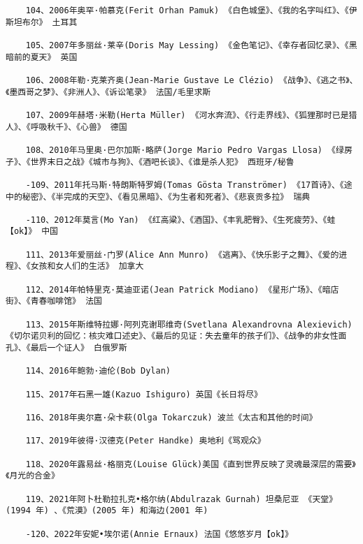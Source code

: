 \documentclass[UTF8]{../RepresentationUniverse}
\begin{document}
\begin{lstlisting}
    104、2006年奥罕·帕慕克(Ferit Orhan Pamuk) 《白色城堡》、《我的名字叫红》、《伊斯坦布尔》 土耳其
    
    105、2007年多丽丝·莱辛(Doris May Lessing) 《金色笔记》、《幸存者回忆录》、《黑暗前的夏天》 英国
    
    106、2008年勒·克莱齐奥(Jean-Marie Gustave Le Clézio) 《战争》、《逃之书》、《墨西哥之梦》、《非洲人》、《诉讼笔录》 法国/毛里求斯
    
    107、2009年赫塔·米勒(Herta Müller) 《河水奔流》、《行走界线》、《狐狸那时已是猎人》、《呼吸秋千》、《心兽》 德国
    
    108、2010年马里奥·巴尔加斯·略萨(Jorge Mario Pedro Vargas Llosa) 《绿房子》、《世界末日之战》《城市与狗》、《酒吧长谈》、《谁是杀人犯》 西班牙/秘鲁
    
    -109、2011年托马斯·特朗斯特罗姆(Tomas Gösta Tranströmer) 《17首诗》、《途中的秘密》、《半完成的天空》、《看见黑暗》、《为生者和死者》、《悲哀贡多拉》 瑞典
    
    -110、2012年莫言(Mo Yan) 《红高粱》、《酒国》、《丰乳肥臀》、《生死疲劳》、《蛙【ok】》 中国
    
    111、2013年爱丽丝·门罗(Alice Ann Munro) 《逃离》、《快乐影子之舞》、《爱的进程》、《女孩和女人们的生活》 加拿大
    
    112、2014年帕特里克·莫迪亚诺(Jean Patrick Modiano) 《星形广场》、《暗店街》、《青春咖啡馆》 法国
    
    113、2015年斯维特拉娜·阿列克谢耶维奇(Svetlana Alexandrovna Alexievich) 《切尔诺贝利的回忆：核灾难口述史》、《最后的见证：失去童年的孩子们》、《战争的非女性面孔》、《最后一个证人》 白俄罗斯
    
    114、2016年鲍勃·迪伦(Bob Dylan) 
    
    115、2017年石黑一雄(Kazuo Ishiguro) 英国《长日将尽》
    
    116、2018年奥尔嘉·朵卡萩(Olga Tokarczuk) 波兰《太古和其他的时间》
    
    117、2019年彼得·汉德克(Peter Handke) 奥地利《骂观众》
    
    118、2020年露易丝·格丽克(Louise Glück)美国《直到世界反映了灵魂最深层的需要》《月光的合金》
    
    119、2021年阿卜杜勒拉扎克•格尔纳(Abdulrazak Gurnah) 坦桑尼亚 《天堂》(1994 年) 、《荒漠》(2005 年) 和海边(2001 年) 

    -120、2022年安妮•埃尔诺(Annie Ernaux) 法国《悠悠岁月【ok】》
\end{lstlisting}
\end{document}
